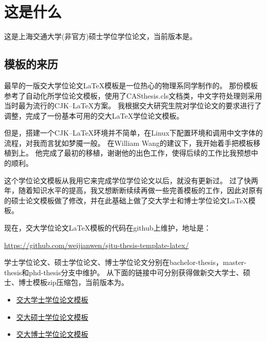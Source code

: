 
\chapter{这是什么}
\label{chap:what}

这是上海交通大学(非官方)硕士学位学位论文，当前版本是\version。

\section{模板的来历}

最早的一版交大学位论文\LaTeX{}模板是一位热心的物理系同学制作的。
那份模板参考了自动化所学位论文模板，使用了CASthesis.cls文档类，中文字符处理则采用当时最为流行的CJK--\LaTeX{}方案。
我根据交大研究生院对学位论文的要求进行了调整，完成了一份基本可用的交大\LaTeX{}学位论文模板。

但是，搭建一个CJK--\LaTeX{}环境并不简单，在Linux下配置环境和调用中文字体的流程，对我而言犹如梦魇一般。
在William Wang的建议下，我开始着手把模板移植到\XeTeX{}上。
他完成了最初的移植，谢谢他的出色工作，使得后续的工作比我预想中的顺利。

这个学位论文模板从我用它来完成学位学位论文以后，就没有更新过。
过了快两年，随着知识水平的提高，我又想断断续续再做一些完善模板的工作，因此对原有的硕士论文模板做了修改，并在此基础上做了交大学士和博士学位论文\LaTeX{}模板。

现在，交大学位论文\LaTeX{}模板的代码在github上维护，地址是：

	\url{https://github.com/weijianwen/sjtu-thesis-template-latex/}

学士学位论文、硕士学位论文、博士学位论文分别在bachelor-thesis，master-thesis和phd-thesis分支中维护。
从下面的链接中可分别获得做新交大学士、硕士、博士模板zip压缩包，当前版本为\version{}。

\begin{itemize}
	\item \href{https://github.com/weijianwen/sjtu-thesis-template-latex/archive/bachelor-0.5.zip}{交大学士学位论文模板\version} 
	\item \href{https://github.com/weijianwen/sjtu-thesis-template-latex/archive/master-0.5.zip}{交大硕士学位论文模板\version}
	\item \href{https://github.com/weijianwen/sjtu-thesis-template-latex/archive/phd-0.5.zip}{交大博士学位论文模板\version}
\end{itemize}

